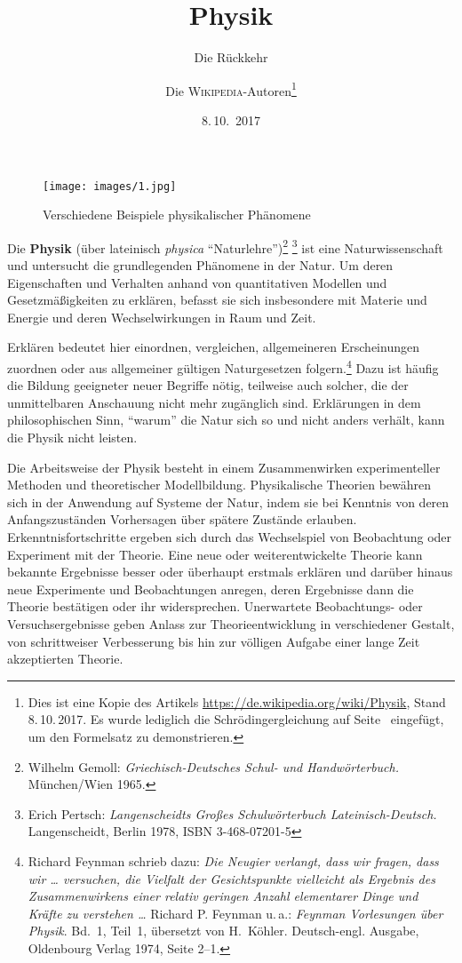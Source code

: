 \documentclass[titlepage, parkskip=full, twocolumn, landscape]{scrartcl}
\title{Physik}
\author{Die \textsc{Wikipedia}-Autoren\thanks{Dies ist eine Kopie des Artikels \url{https://de.wikipedia.org/wiki/Physik}, Stand 8.\,10.\,2017. Es wurde lediglich die Schrödingergleichung auf Seite~\pageref{eq:schrödinger} eingefügt, um den Formelsatz zu demonstrieren.}}
\date{8.\,10.~2017}
\subtitle{Die Rückkehr}
\begin{document}
\maketitle

\tableofcontents
\setlength{\parindent}{3em}
\begin{figure}
	\centering
	\texttt{[image: images/1.jpg]}
	\caption{Verschiedene Beispiele physikalischer Phänomene}
\end{figure}

\noindent Die \textbf{Physik} (über lateinisch \emph{physica} "`Naturlehre"')\footnote{Wilhelm Gemoll: \emph{Griechisch-Deutsches Schul- und Handwörterbuch.} München/Wien 1965.} \footnote{Erich Pertsch: \emph{Langenscheidts Großes Schulwörterbuch Lateinisch-Deutsch.} Langenscheidt, Berlin 1978, ISBN 3-468-07201-5} ist eine Naturwissenschaft und untersucht die grundlegenden Phänomene in der Natur. Um deren Eigenschaften und Verhalten anhand von quantitativen Modellen und Gesetzmäßigkeiten zu erklären, befasst sie sich insbesondere mit Materie und Energie und deren Wechselwirkungen in Raum und Zeit.

Erklären bedeutet hier einordnen, vergleichen, allgemeineren Erscheinungen zuordnen oder aus allgemeiner gültigen Naturgesetzen folgern.\footnote{Richard Feynman schrieb dazu: \emph{Die Neugier verlangt, dass wir fragen, dass wir \dots{} versuchen, die Vielfalt der Gesichtspunkte vielleicht als Ergebnis des Zusammenwirkens einer relativ geringen Anzahl elementarer Dinge und Kräfte zu verstehen \dots} Richard P. Feynman u.\,a.: \emph{Feynman Vorlesungen über Physik}. Bd.~1, Teil~1, übersetzt von H.~Köhler. Deutsch-engl. Ausgabe, Oldenbourg Verlag 1974, Seite 2--1.} Dazu ist häufig die Bildung geeigneter neuer Begriffe nötig, teilweise auch solcher, die der unmittelbaren Anschauung nicht mehr zugänglich sind. Erklärungen in dem philosophischen Sinn, "`warum"' die Natur sich so und nicht anders verhält, kann die Physik nicht leisten.

Die Arbeitsweise der Physik besteht in einem Zusammenwirken experimenteller Methoden und theoretischer Modellbildung. Physikalische Theorien bewähren sich in der Anwendung auf Systeme der Natur, indem sie bei Kenntnis von deren Anfangszuständen Vorhersagen über spätere Zustände erlauben. Erkenntnisfortschritte ergeben sich durch das Wechselspiel von Beobachtung oder Experiment mit der Theorie. Eine neue oder weiterentwickelte Theorie kann bekannte Ergebnisse besser oder überhaupt erstmals erklären und darüber hinaus neue Experimente und Beobachtungen anregen, deren Ergebnisse dann die Theorie bestätigen oder ihr widersprechen. Unerwartete Beobachtungs- oder Versuchsergebnisse geben Anlass zur Theorieentwicklung in verschiedener Gestalt, von schrittweiser Verbesserung bis hin zur völligen Aufgabe einer lange Zeit akzeptierten Theorie.
\end{document}

